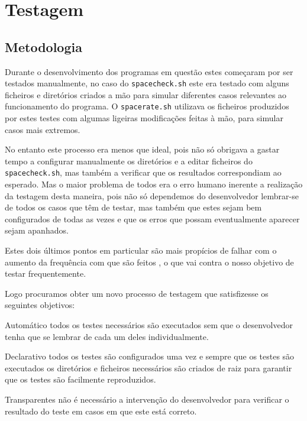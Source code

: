 \chapter{Testagem}

\section{Metodologia}\label{sec:testing_metodology}

Durante o desenvolvimento dos programas em questão estes começaram por ser
testados manualmente, no caso do \Verb|spacecheck.sh| este era testado com alguns
ficheiros e diretórios criados a mão para simular diferentes casos relevantes ao
funcionamento do programa. O \Verb|spacerate.sh| utilizava os ficheiros produzidos
por estes testes com algumas ligeiras modificações feitas à mão, para simular casos
mais extremos.

No entanto este processo era menos que ideal, pois não só obrigava a gastar
tempo a configurar manualmente os diretórios e a editar ficheiros do
\Verb|spacecheck.sh|, mas também a verificar que os
resultados correspondiam ao esperado. Mas o maior problema de todos era o erro
humano inerente a realização da testagem desta maneira, pois não só dependemos
do desenvolvedor lembrar-se de todos os casos que têm de testar, mas também que
estes sejam bem configurados de todas as vezes e que os erros que possam
eventualmente aparecer sejam apanhados.

Estes dois últimos pontos em particular são mais propícios de falhar com o
aumento da frequência com que são feitos \cite{fewster1999software, rafi2012benefits},
o que vai contra o nosso objetivo de testar frequentemente.

Logo procuramos obter um novo processo de testagem que satisfizesse os seguintes
objetivos:

\begin{enumdescript}
	\item[Automático]
	todos os testes necessários são executados sem que o desenvolvedor tenha que
	se lembrar de cada um deles individualmente.
	\item[Declarativo]
	todos os testes são configurados uma vez e sempre que os testes são
	executados os diretórios e ficheiros necessários são criados de raiz
	para garantir que os testes são facilmente reproduzidos.
	\item[Transparentes]
	não é necessário a intervenção do desenvolvedor para verificar o resultado
	do teste em casos em que este está correto.
\end{enumdescript}

